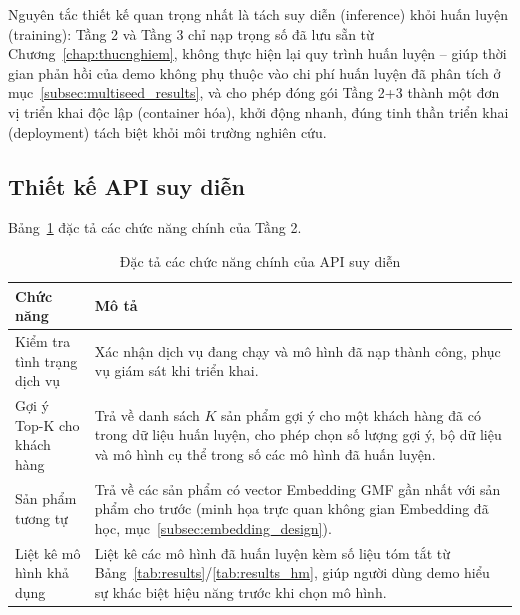 Nguyên tắc thiết kế quan trọng nhất là tách suy diễn (inference) khỏi huấn luyện (training): Tầng 2 và Tầng 3 chỉ nạp trọng số đã lưu sẵn từ Chương~\ref{chap:thucnghiem}, không thực hiện lại quy trình huấn luyện -- giúp thời gian phản hồi của demo không phụ thuộc vào chi phí huấn luyện đã phân tích ở mục~\ref{subsec:multiseed_results}, và cho phép đóng gói Tầng 2+3 thành một đơn vị triển khai độc lập (container hóa), khởi động nhanh, đúng tinh thần triển khai (deployment) tách biệt khỏi môi trường nghiên cứu.

\subsection{Thiết kế API suy diễn}
\label{subsec:demo_api}

Bảng~\ref{tab:demo_api} đặc tả các chức năng chính của Tầng 2.

\begin{table}[htbp]
    \centering
    \caption{Đặc tả các chức năng chính của API suy diễn}
    \label{tab:demo_api}
    \begin{tabularx}{\textwidth}{|l|X|}
        \hline
        \textbf{Chức năng} & \textbf{Mô tả} \\
        \hline
        Kiểm tra tình trạng dịch vụ & Xác nhận dịch vụ đang chạy và mô hình đã nạp thành công, phục vụ giám sát khi triển khai. \\
        \hline
        Gợi ý Top-K cho khách hàng & Trả về danh sách $K$ sản phẩm gợi ý cho một khách hàng đã có trong dữ liệu huấn luyện, cho phép chọn số lượng gợi ý, bộ dữ liệu và mô hình cụ thể trong số các mô hình đã huấn luyện. \\
        \hline
        Sản phẩm tương tự & Trả về các sản phẩm có vector Embedding GMF gần nhất với sản phẩm cho trước (minh họa trực quan không gian Embedding đã học, mục~\ref{subsec:embedding_design}). \\
        \hline
        Liệt kê mô hình khả dụng & Liệt kê các mô hình đã huấn luyện kèm số liệu tóm tắt từ Bảng~\ref{tab:results}/\ref{tab:results_hm}, giúp người dùng demo hiểu sự khác biệt hiệu năng trước khi chọn mô hình. \\
        \hline
    \end{tabularx}
\end{table}

